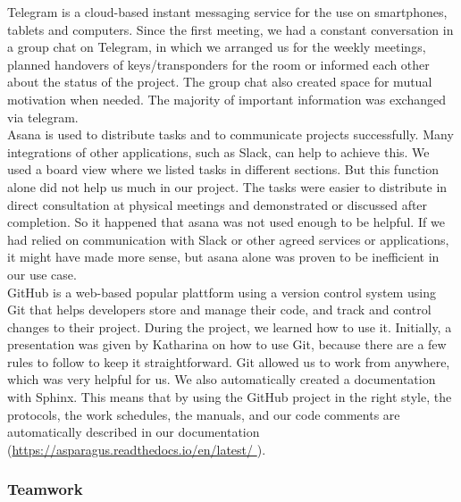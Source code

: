 Telegram is a cloud-based instant messaging service for the use on smartphones, tablets and computers. Since the first meeting, we had a constant conversation in a group chat on Telegram, in which we arranged us for the weekly meetings, planned handovers of keys/transponders for the room or informed each other about the status of the project. The group chat also created space for mutual motivation when needed. The majority of important information was exchanged via telegram. \\
Asana is used to distribute tasks and to communicate projects successfully. Many integrations of other applications, such as Slack, can help to achieve this. We used a board view where we listed tasks in different sections. But this function alone did not help us much in our project. The tasks were easier to distribute in direct consultation at physical meetings and demonstrated or discussed after completion. So it happened that asana was not used enough to be helpful. If we had relied on communication with Slack or other agreed services or applications, it might have made more sense, but asana alone was proven to be inefficient in our use case. \\
GitHub is a web-based popular plattform using a version control system using Git that helps developers store and manage their code, and track and control changes to their project. During the project, we learned how to use it. Initially, a presentation was given by Katharina on how to use Git, because there are a few rules to follow to keep it straightforward. Git allowed us to work from anywhere, which was very helpful for us. We also automatically created a documentation with Sphinx. This means that by using the GitHub project in the right style, the protocols, the work schedules, the manuals, and our code comments are automatically described in our documentation (\url{https://asparagus.readthedocs.io/en/latest/ }).


\subsubsection{Teamwork}
\label{subsec:Teamwork}

